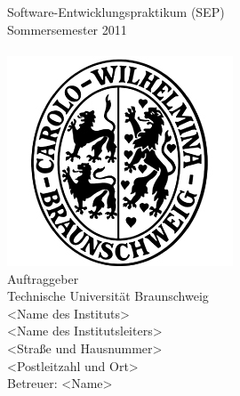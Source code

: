 

\thispagestyle{plain}      %

\begin{titlepage}

\begin{center}

{}\\[5ex]

{}\\[5ex]

Software-Entwicklungspraktikum (SEP)\\
Sommersemester 2011\\[8ex]

{}\\[5ex]

\includegraphics[scale=0.8]{bilder/carolo.jpg}\\[6ex]

Auftraggeber\\
Technische Universität Braunschweig\\
<Name des Instituts>\\
<Name des Institutsleiters>\\
<Straße und Hausnummer>\\
<Postleitzahl und Ort>\\[2ex]
Betreuer: <Name>\\[5ex]


\end{center}
\end{titlepage}
